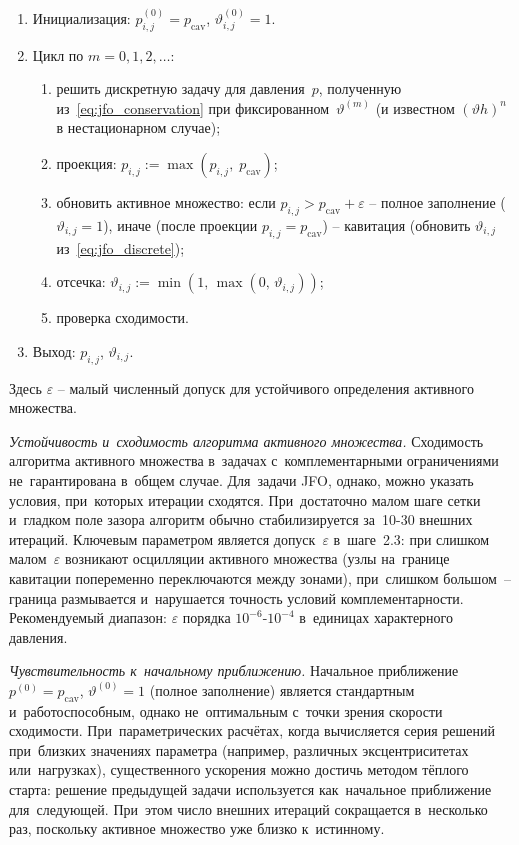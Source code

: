 \begin{enumerate}
  \item Инициализация: $p^{(0)}_{i,j} = p_{\mathrm{cav}}$,
        $\vartheta^{(0)}_{i,j} = 1$.
  \item Цикл по $m = 0, 1, 2, \ldots$:
    \begin{enumerate}
      \item[2.1)] решить дискретную задачу для давления~$p$,
            полученную из~\eqref{eq:jfo_conservation}
            при фиксированном~$\vartheta^{(m)}$
            (и известном $(\vartheta h)^n$ в нестационарном случае);
      \item[2.2)] проекция:
            $p_{i,j} := \max(p_{i,j},\; p_{\mathrm{cav}})$;
      \item[2.3)] обновить активное множество: если
            $p_{i,j} > p_{\mathrm{cav}} + \varepsilon$ --
            полное заполнение ($\vartheta_{i,j} = 1$),
            иначе (после проекции
            $p_{i,j} = p_{\mathrm{cav}}$) -- кавитация
            (обновить $\vartheta_{i,j}$
            из~\eqref{eq:jfo_discrete});
      \item[2.4)] отсечка:
            $\vartheta_{i,j} := \min(1,\,\max(0,\,\vartheta_{i,j}))$;
      \item[2.5)] проверка сходимости.
    \end{enumerate}
  \item Выход: $p_{i,j}$, $\vartheta_{i,j}$.
\end{enumerate}
Здесь $\varepsilon$ -- малый численный допуск для устойчивого
определения активного множества.

\textit{Устойчивость и~сходимость алгоритма активного множества.}
Сходимость алгоритма активного множества в~задачах с~комплементарными ограничениями не~гарантирована в~общем случае. Для~задачи JFO, однако, можно указать условия, при~которых итерации сходятся. При~достаточно малом шаге сетки и~гладком поле зазора алгоритм обычно стабилизируется за~10-30 внешних итераций. Ключевым параметром является допуск~$\varepsilon$ в~шаге~2.3: при слишком малом~$\varepsilon$ возникают осцилляции активного множества (узлы на~границе кавитации попеременно переключаются между зонами), при~слишком большом~-- граница размывается и~нарушается точность условий комплементарности. Рекомендуемый диапазон: $\varepsilon$ порядка $10^{-6}$-$10^{-4}$ в~единицах характерного давления.

\textit{Чувствительность к~начальному приближению.}
Начальное приближение $p^{(0)} = p_{\mathrm{cav}}$, $\vartheta^{(0)} = 1$ (полное заполнение) является стандартным и~работоспособным, однако не~оптимальным с~точки зрения скорости сходимости. При~параметрических расчётах, когда вычисляется серия решений при~близких значениях параметра (например, различных эксцентриситетах или~нагрузках), существенного ускорения можно достичь методом тёплого старта: решение предыдущей задачи используется как~начальное приближение для~следующей. При~этом число внешних итераций сокращается в~несколько раз, поскольку активное множество уже близко к~истинному.

